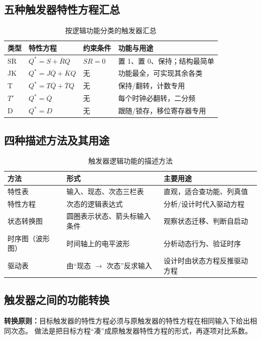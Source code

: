 \subsection{五种触发器特性方程汇总}
\begin{table}[!htbp]
\centering
\caption{按逻辑功能分类的触发器汇总}
\begin{tabular}{llll}
\toprule
类型 & 特性方程 & 约束条件 & 功能与用途 \\
\midrule
SR & $Q^*=S+\overline{R}Q$ & $SR=0$ & 置 1、置 0、保持；结构最简单 \\
JK & $Q^*=J\overline{Q}+\overline{K}Q$ & 无 & 功能最全，可实现其余各类 \\
T & $Q^*=T\overline{Q}+\overline{T}Q$ & 无 & 保持/翻转，计数专用 \\
$T'$ & $Q^*=\overline{Q}$ & 无 & 每个时钟必翻转，二分频 \\
D & $Q^*=D$ & 无 & 跟随/锁存，移位寄存器专用 \\
\bottomrule
\end{tabular}
\end{table}

\subsection{四种描述方法及其用途}
\begin{table}[!htbp]
\centering
\caption{触发器逻辑功能的描述方法}
\begin{tabular}{lll}
\toprule
方法 & 形式 & 主要用途 \\
\midrule
特性表 & 输入、现态、次态三栏表 & 直观，适合查功能、列真值 \\
特性方程 & 次态的逻辑表达式 & 分析/设计时代入驱动方程 \\
状态转换图 & 圆圈表示状态、箭头标输入条件 & 观察状态迁移、判断自启动 \\
时序图（波形图） & 时间轴上的电平波形 & 分析动态行为、验证时序 \\
驱动表 & 由“现态 $\rightarrow$ 次态”反求输入 & 设计时由状态方程反推驱动方程 \\
\bottomrule
\end{tabular}
\end{table}

\subsection{触发器之间的功能转换}
\textbf{转换原则：}目标触发器的特性方程必须与原触发器的特性方程在相同输入下给出相同次态。
做法是把目标方程“凑”成原触发器特性方程的形式，再逐项对比系数。


